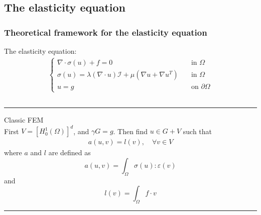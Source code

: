 \subsection{The elasticity equation}

\begin{frame}[t]
    \frametitle{Theoretical framework for the elasticity equation} The elasticity equation: \large
    \begin{align}
        \begin{cases}
        \nabla \cdot \sigma(u) + f = 0 &\quad \text{in } \Omega\\   
        \sigma(u) = \lambda(\nabla \cdot u) \mathcal{I} + \mu (\nabla u + \nabla u^T)  &\quad \text{in } \Omega\\
        u = g &\quad \text{on } \partial\Omega
        \end{cases}
        \label{eq:elasticity}
    \end{align}
    \normalsize

    \pause


\begin{columns}[T] %
    \begin{column}{.44\textwidth}
        \color{purple}\rule{\linewidth}{4pt}
        Classic FEM
        \color{black} \\ \footnotesize
        First $V=\left[H_0^1(\Omega)\right]^d$, and $\gamma G = g$. Then find $u \in G + V $ such that
        \begin{align*}
         a(u,v)=l(v), \quad \forall v \in V
        \end{align*}
        where $a$ and $l$ are defined as 
        $$
        a(u,v) = \int_{\Omega} \sigma (u) : \varepsilon (v)
        $$
        and
        $$
        l(v) = \int_{\Omega} f\cdot v
        $$
    \hrule
    \end{column}%

    \hfill%
    \pause
    

\end{columns}
\end{frame}
